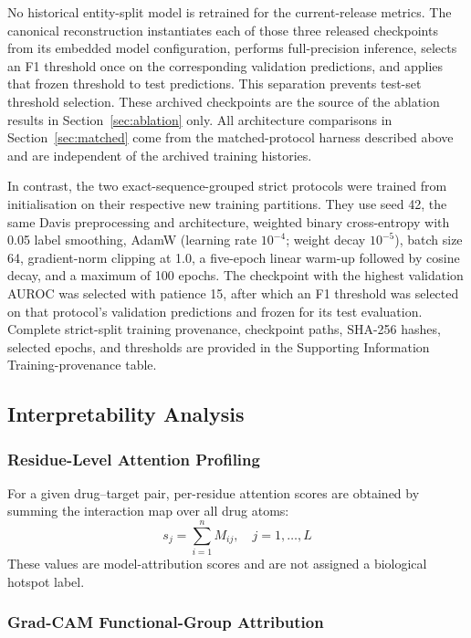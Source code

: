 \documentclass[fleqn,10pt]{wlscirep}
\begin{document}
No historical entity-split model is retrained for the current-release metrics.
The canonical reconstruction instantiates each of those three released
checkpoints from its embedded model configuration, performs full-precision
inference, selects an F1 threshold once on the corresponding validation
predictions, and applies that frozen threshold to test predictions. This
separation prevents test-set threshold selection.
These archived checkpoints are the source of the ablation results in
Section~\ref{sec:ablation} only.  All architecture comparisons in
Section~\ref{sec:matched} come from the matched-protocol harness described
above and are independent of the archived training histories.

In contrast, the two exact-sequence-grouped strict protocols were trained from
initialisation on their respective new training partitions. They use seed 42,
the same Davis preprocessing and architecture, weighted binary cross-entropy
with 0.05 label smoothing, AdamW (learning rate $10^{-4}$; weight decay
$10^{-5}$), batch size 64, gradient-norm clipping at 1.0, a five-epoch linear
warm-up followed by cosine decay, and a maximum of 100 epochs. The checkpoint
with the highest validation AUROC was selected with patience 15, after which an
F1 threshold was selected on that protocol's validation predictions and frozen
for its test evaluation. Complete strict-split training provenance, checkpoint
paths, SHA-256 hashes, selected epochs, and thresholds are provided in the
Supporting Information Training-provenance table.

\subsection{Interpretability Analysis}

\subsubsection{Residue-Level Attention Profiling}

For a given drug--target pair, per-residue attention scores are obtained by
summing the interaction map over all drug atoms:
\begin{equation}
s_j = \sum_{i=1}^{n} M_{ij},\quad j=1,\ldots,L
\end{equation}
These values are model-attribution scores and are not assigned a biological
hotspot label.

\subsubsection{Grad-CAM Functional-Group Attribution}
\end{document}
